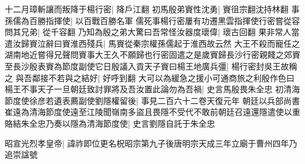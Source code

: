 十二月璋斬讓而叛降于楊行密|{
	降戶江翻}
初馬殷弟賨性沈勇|{
	賨徂宗翻沈持林翻}
事孫儒為百勝指揮使|{
	以百戰百勝名軍}
儒死事楊行密屢有功遷黑雲指揮使行密嘗從容問其兄弟|{
	從千容翻}
乃知為殷之弟大驚曰吾常怪汝器度瓌偉|{
	瓌古回翻}
果非常人當遣汝歸賨泣辭曰賨淮西殘兵|{
	馬賨從秦宗權孫儒起于淮西故云然}
大王不殺而寵任之湖南地近嘗得兄聲問賨事大王久不願歸也行密固遣之是歲賨歸長沙行密親餞之郊賨至長沙殷表賨為節度副使它日殷議入貢天子賨曰楊王地廣兵彊|{
	楊行密封吳王故稱之}
與吾鄰接不若與之結好|{
	好呼到翻}
大可以為緩急之援小可通商旅之利殷作色曰楊王不事天子一旦朝廷致討罪將及吾汝置此論勿為吾禍|{
	史言馬殷畏朱全忠}
初清海節度使徐彦若遺表薦副使劉隱權留後|{
	事見二百六十二卷天復元年}
朝廷以兵部尚書崔遠為清海節度使遠至江陵聞嶺南多盜且畏隱不受代不敢前朝廷召遠還隱遣使以重賂結朱全忠乃奏以隱為清海節度使|{
	史言劉隱自託于朱全忠}


昭宣光烈孝皇帝|{
	諱祚即位更名柷昭宗第九子後唐明宗天成三年立廟于曹州四年乃追崇諡號}


